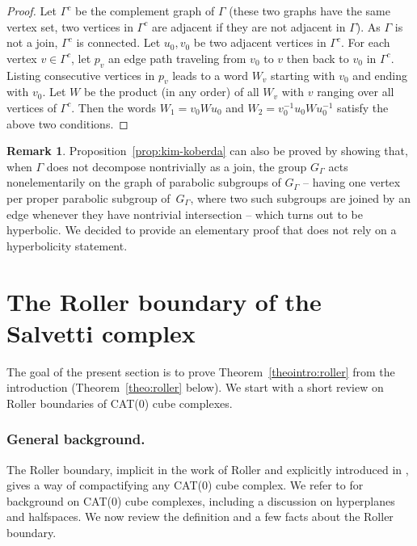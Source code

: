 \documentclass[JEP,XML,SOM,Unicode,NoFloatCountersInSection,published]{cedram}
\theoremstyle{plain}
\theoremstyle{definition}
\newtheorem{rk}[theo]{Remark}
\begin{document}
\begin{proof}
Let $\Gamma^c$ be the complement graph of $\Gamma$ (\ie these two graphs have the same vertex set, two vertices in $\Gamma^c$ are adjacent if they are not adjacent in $\Gamma$). As $\Gamma$ is not a join, $\Gamma^c$ is connected. Let $u_0,v_0$ be two adjacent vertices in $\Gamma^c$. For each vertex $v\in \Gamma^c$, let $p_v$ an edge path traveling from $v_0$ to $v$ then back to $v_0$ in $\Gamma^c$. Listing consecutive vertices in $p_v$ leads to a word $W_v$ starting with $v_0$ and ending with $v_0$. Let $W$ be the product (in any order) of all $W_v$ with $v$ ranging over all vertices of $\Gamma^c$. Then the words $W_1=v_0Wu_0$ and $W_2=v^{-1}_0u_0Wu^{-1}_0$ satisfy the above two conditions.
\end{proof}

\begin{rk}
Proposition~\ref{prop:kim-koberda} can also be proved by showing that, when $\Gamma$ does not decompose nontrivially as a join, the group $G_\Gamma$ acts nonelementarily on the graph of parabolic subgroups of $G_\Gamma$ -- having one vertex per proper parabolic subgroup of~$G_\Gamma$, where two such subgroups are joined by an edge whenever they have nontrivial intersection -- which turns out to be hyperbolic. We decided to provide an elementary proof that does not rely on a hyperbolicity statement.
\end{rk}

\section{The Roller boundary of the Salvetti complex}

The goal of the present section is to prove Theorem~\ref{theointro:roller} from the introduction (Theorem~\ref{theo:roller} below). We start with a short review on Roller boundaries of CAT(0) cube complexes.

\label{sec:background-roller}

\subsubsection*{General background.} The Roller boundary, implicit in the work of Roller \cite{Rol} and explicitly introduced in \cite{BCGNW}, gives a way of compactifying any CAT(0) cube complex. We refer to \cite{sageev2012cat} for background on CAT(0) cube complexes, including a discussion on hyperplanes and halfspaces. We now review the definition and a few facts about the Roller boundary.
\end{document}
